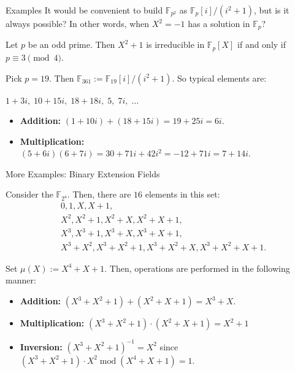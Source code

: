 \documentclass{beamer}
\begin{document}
    \begin{frame}{Examples}
        It would be convenient to build $\mathbb{F}_{p^2}$ as $\mathbb{F}_p[i]/(i^2+1)$, but is it always possible? In other words, when $X^2=-1$ has a solution in $\mathbb{F}_p$?\pause
        \begin{theorem}
            Let $p$ be an odd prime. Then $X^2+1$ is irreducible in $\mathbb{F}_p[X]$ if and only if $p \equiv 3 \pmod{4}$.\pause
        \end{theorem}

        \begin{example}
            Pick $p=19$. Then $\mathbb{F}_{361} := \mathbb{F}_{19}[i]/(i^2+1)$. So typical elements are:\pause
            
            $1+3i, \; 10+15i, \; 18+18i, \; 5, \; 7i, \; \dots$
            
            \begin{itemize}
                \item \textbf{Addition:} $(1+10i)+(18+15i)= 19 + 25i = 6i$.\pause
                \item \textbf{Multiplication:} $(5+6i)(6+7i)=30+71i+42i^2=-12+71i=7+14i$.
            \end{itemize}
        \end{example}
    \end{frame}

    \begin{frame}{More Examples: Binary Extension Fields}
        \begin{example}
            Consider the $\mathbb{F}_{2^4}$. Then, there are $16$ elements in this set:\pause
            \begin{equation*}
                \begin{aligned}
                    &0, 1, X, X+1,\\ &X^2, X^2+1, X^2+X, X^2+X+1,\\
                    &X^3, X^3+1, X^3+X, X^3+X+1,\\ &X^3+X^2, X^3+X^2+1, X^3+X^2+X, X^3+X^2+X+1.
                \end{aligned}
            \end{equation*}
        
            Set $\mu(X):=X^4+X+1$. Then, operations are performed in the following manner:\pause
            \begin{itemize}
                \item \textbf{Addition:} $(X^3+X^2+1)+(X^2+X+1) = X^3+X$.\pause
                \item \textbf{Multiplication:} $(X^3+X^2+1)\cdot(X^2+X+1)=X^2+1$\pause
                \item \textbf{Inversion:} $(X^3+X^2+1)^{-1}=X^2$ since $(X^3+X^2+1)\cdot X^2 \; \text{mod} \; (X^4+X+1) = 1$.
            \end{itemize}
        \end{example}
    \end{frame}
\end{document}
